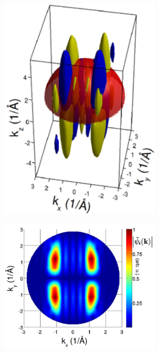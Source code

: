\begin{figure}
\begin{subfigure}{0.3\textwidth}
                \includegraphics[width=0.9\textwidth]{DFT2.PNG}
                \caption{}
                \label{fig:DFT2}
            \end{subfigure}
            \begin{subfigure}{0.3\textwidth}
                \centering
                \includegraphics[width=0.9\textwidth]{DFT3.PNG}

\end{subfigure}
\end{figure}
